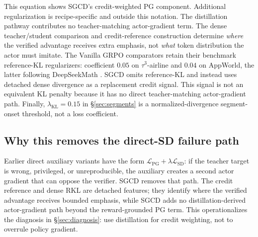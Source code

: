 This equation shows SGCD's credit-weighted PG component. Additional
regularization is recipe-specific and outside this notation. The distillation
pathway contributes no
teacher-matching actor-gradient term. The dense
teacher/student comparison and credit-reference construction determine
\emph{where} the verified advantage receives extra emphasis, not \emph{what}
token distribution the actor must imitate. The Vanilla GRPO comparators retain
their benchmark reference-KL regularizers: coefficient $0.05$ on
$\tau^3$-airline and $0.04$ on AppWorld, the latter following DeepSeekMath
\citep{deepseekmath2024}. SGCD omits reference-KL and instead uses detached
dense divergence as a replacement credit signal. This signal is not an
equivalent KL penalty because it has no direct teacher-matching actor-gradient
path. Finally, $\lambda_{\mathrm{KL}}=0.15$ in \S\ref{sec:segments} is a
normalized-divergence segment-onset threshold, not a loss coefficient.

\subsection{Why this removes the direct-SD failure path}
\label{sec:safety}
Earlier direct auxiliary variants have the form
$\mathcal{L}_{\text{PG}}+\lambda\mathcal{L}_{\text{SD}}$: if the teacher target
is wrong, privileged, or unreproducible, the auxiliary creates a second actor
gradient that can oppose the verifier. SGCD removes that path. The credit
reference and dense RKL are detached features; they identify where the verified
advantage receives bounded emphasis, while SGCD adds no distillation-derived
actor-gradient path beyond the reward-grounded PG term. This operationalizes the diagnosis in
\S\ref{sec:diagnosis}: use distillation for credit weighting, not to overrule
policy gradient.
